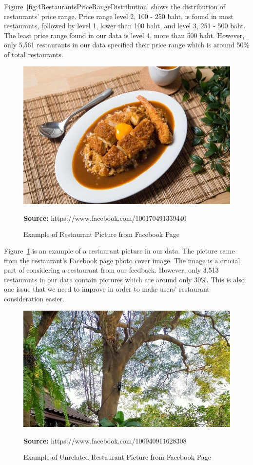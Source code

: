 \documentclass[12pt,oneside,openright,a4paper]{cpe-english-project}
\newcommand*{\captionsource}[2]{%
  \caption[{#1}]{#1}\vspace{-8pt}
  \textbf{Source:} #2}
\begin{document}
Figure~\ref{fig:4RestaurantsPriceRangeDistribution} shows the distribution of restaurants' price range. Price range level 2, 100 - 250 baht, is found in most restaurants, followed by level 1, lower than 100 baht, and level 3, 251 - 500 baht. The least price range found in our data is level 4, more than 500 baht. However, only 5,561 restaurants in our data specified their price range which is around 50\% of total restaurants.

\begin{figure}[H]\centering
\includegraphics[width=350pt]{./images/4ExampleofRestaurantPicturefromFacebookPage.jpeg}
\captionsource{Example of Restaurant Picture from Facebook Page}{https://www.facebook.com/100170491339440}\label{fig:4ExampleofRestaurantPicturefromFacebookPage}
\end{figure}


Figure~\ref{fig:4ExampleofRestaurantPicturefromFacebookPage} is an example of a restaurant picture in our data. The picture came from the restaurant's Facebook page photo cover image. The image is a crucial part of considering a restaurant from our feedback. However, only 3,513 restaurants in our data contain pictures which are around only 30\%. This is also one issue that we need to improve in order to make users’ restaurant consideration easier.

\begin{figure}[H]\centering
\includegraphics[width=350pt]{./images/4ExampleofUnrelatedRestaurantPicturefromFacebookPage.jpeg}
\captionsource{Example of Unrelated Restaurant Picture from Facebook Page}{https://www.facebook.com/100940911628308}\label{fig:4ExampleofUnrelatedRestaurantPicturefromFacebookPage}
\end{figure}
\end{document}
